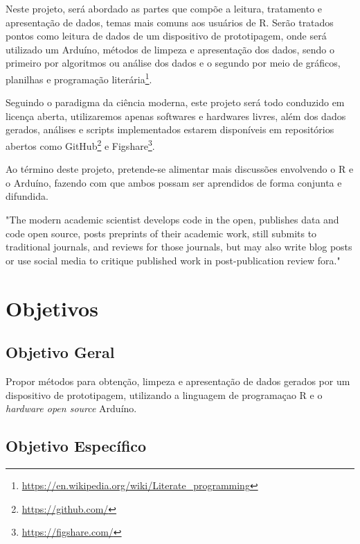 \documentclass[
	article,			%
	11pt,				%
	oneside,			%
	a4paper,			%
	english,			%
	brazil,				%
	sumario=tradicional
	]{abntex2}
\begin{document}
Neste projeto, será abordado as partes que compõe a leitura, tratamento e 
apresentação de dados, temas mais comuns aos usuários de R. Serão tratados 
pontos como leitura de dados de um dispositivo de prototipagem, onde será 
utilizado um Arduíno, métodos de limpeza e apresentação dos dados, sendo o 
primeiro por 
algoritmos ou análise dos dados e o segundo por meio de gráficos, planilhas e 
programação 
literária\footnote{\url{https://en.wikipedia.org/wiki/Literate_programming}}.

Seguindo o paradigma da ciência moderna, este projeto será todo conduzido em 
licença aberta, utilizaremos apenas softwares e hardwares livres, além dos 
dados 
gerados, análises e scripts implementados estarem disponíveis em repositórios 
abertos como GitHub\footnote{\url{https://github.com/}} e 
Figshare\footnote{\url{https://figshare.com/}}.

Ao término deste projeto, pretende-se alimentar mais discussões envolvendo o R e o 
Arduíno, fazendo com que ambos possam ser aprendidos de forma conjunta e 
difundida. 

\begin{citacao}[english]
  "The modern academic scientist develops code in the open, publishes data and 
code open source, posts preprints of their academic work, still submits to 
traditional journals, and reviews for those journals, but may also write blog 
posts or use social media to critique published work in post-publication review 
fora."\cite{Peng2015}
\end{citacao}
\section[Objetivos]{Objetivos}

\subsection{Objetivo Geral}

Propor métodos para obtenção, limpeza e apresentação de dados gerados por 
um dispositivo de prototipagem, utilizando a linguagem de programaçao R e o 
\emph{hardware open source} Arduíno.

\subsection{Objetivo Específico}
\end{document}
